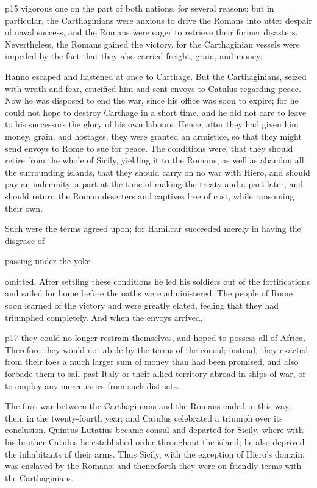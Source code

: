 p15 vigorous one on the part of both nations, for several reasons; but in particular, the Carthaginians were anxious to drive the Romans into utter despair of naval success, and the Romans were eager to retrieve their former disasters. Nevertheless, the Romans gained the victory, for the Carthaginian vessels were impeded by the fact that they also carried freight, grain, and money.

Hanno escaped and hastened at once to Carthage. But the Carthaginians, seized with wrath and fear, crucified him and sent envoys to Catulus regarding peace. Now he was disposed to end the war, since his office was soon to expire; for he could not hope to destroy Carthage in a short time, and he did not care to leave to his successors the glory of his own labours. Hence, after they had given him money, grain, and hostages, they were granted an armistice, so that they might send envoys to Rome to sue for peace. The conditions were, that they should retire from the whole of Sicily, yielding it to the Romans, as well as abandon all the surrounding islands, that they should carry on no war with Hiero, and should pay an indemnity, a part at the time of making the treaty and a part later, and should return the Roman deserters and captives free of cost, while ransoming their own.

Such were the terms agreed upon; for Hamilcar succeeded merely in having the disgrace of

passing under the yoke

omitted. After settling these conditions he led his soldiers out of the fortifications and sailed for home before the oaths were administered. The people of Rome soon learned of the victory and were greatly elated, feeling that they had triumphed completely. And when the envoys arrived,

p17 they could no longer restrain themselves, and hoped to possess all of Africa. Therefore they would not abide by the terms of the consul; instead, they exacted from their foes a much larger sum of money than had been promised, and also forbade them to sail past Italy or their allied territory abroad in ships of war, or to employ any mercenaries from such districts.

The first war between the Carthaginians and the Romans ended in this way, then, in the twenty-fourth year; and Catulus celebrated a triumph over its conclusion. Quintus Lutatius became consul and departed for Sicily, where with his brother Catulus he established order throughout the island; he also deprived the inhabitants of their arms. Thus Sicily, with the exception of Hiero's domain, was enslaved by the Romans; and thenceforth they were on friendly terms with the Carthaginians.

